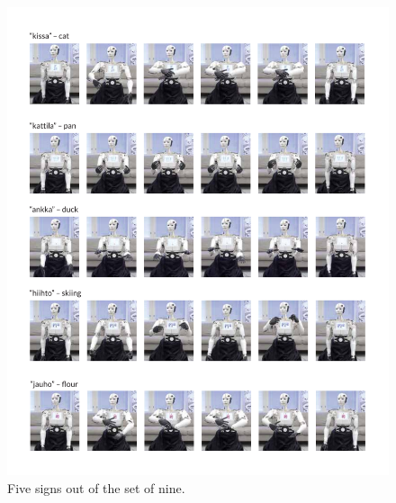 \begin{figure}
\centering
  \includegraphics[width=\linewidth]{images/viittomat1.pdf}
  \caption{Five signs out of the set of nine.}
  \label{fig:viittomat1}
\end{figure}

